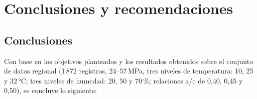 \documentclass[12pt, letterpaper]{article}
\begin{document}
\newpage
\section{Conclusiones y recomendaciones}

\subsection{Conclusiones}

Con base en los objetivos planteados y los resultados obtenidos sobre el conjunto de datos regional (1\,872 registros, 24--57\,MPa, tres niveles de temperatura: 10, 25 y 32\,°C; tres niveles de humedad: 20, 50 y 70\,\%; relaciones a/c de 0{,}40, 0{,}45 y 0{,}50), se concluye lo siguiente:
\end{document}
